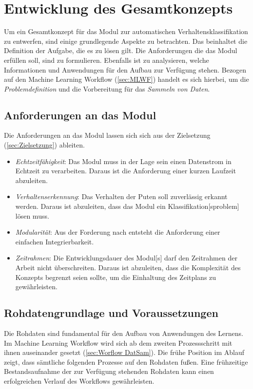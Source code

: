 \section{Entwicklung des Gesamtkonzepts}
Um ein Gesamtkonzept für das \gls{Modul} zur automatischen Verhaltensklassifikation zu entwerfen, sind einige grundlegende Aspekte zu betrachten. Das beinhaltet die Definition der Aufgabe, die es zu lösen gilt. Die Anforderungen die das \gls{Modul} erfüllen soll, sind zu formulieren. Ebenfalls ist zu analysieren, welche Informationen und Anwendungen für den Aufbau zur Verfügung stehen. Bezogen auf den \gls{Machine Learning Workflow} (\ref{sec:MLWF}) handelt es sich hierbei, um die \textit{Problemdefinition} und die Vorbereitung für das \textit{Sammeln von Daten}. \par

\subsection{Anforderungen an das Modul} \label{sec:Meth Anforderungen}

Die Anforderungen an das \gls{Modul} lassen sich sich aus der Zielsetzung (\ref{sec:Zielsetzung}) ableiten. 

\begin{itemize}
    \item \textit{Echtzeitfähigkeit}: Das \gls{Modul} muss in der Lage sein einen Datenstrom in Echtzeit zu verarbeiten. Daraus ist die Anforderung einer kurzen Laufzeit abzuleiten.
    \item \textit{Verhaltenserkennung}: Das Verhalten der Puten soll zuverlässig erkannt werden. Daraus ist abzuleiten, dass das \gls{Modul} ein \gls{Klassifikation}[sproblem] lösen muss.
    \item \textit{Modularität}: Aus der Forderung nach  entsteht die Anforderung einer einfachen Integrierbarkeit.
    \item \textit{Zeitrahmen}: Die Entwicklungsdauer des \gls{Modul}[s] darf den Zeitrahmen der Arbeit nicht überschreiten. Daraus ist abzuleiten, dass die Komplexität des Konzepts begrenzt seien sollte, um die Einhaltung des Zeitplans zu gewährleisten.
\end{itemize}

\subsection{Rohdatengrundlage und Voraussetzungen} \label{sec:Meth RohDat}
Die Rohdaten sind fundamental für den Aufbau von Anwendungen des  Lernens. Im \gls{Machine Learning Workflow} wird sich ab dem zweiten Prozessschritt mit ihnen auseinander gesetzt (\ref{sec:Worflow DatSam}). Die frühe Position im Ablauf zeigt, dass sämtliche folgenden Prozesse auf den Rohdaten fußen. Eine frühzeitige Bestandsaufnahme der zur Verfügung stehenden Rohdaten kann einen erfolgreichen Verlauf des Workflows gewährleisten. \par


